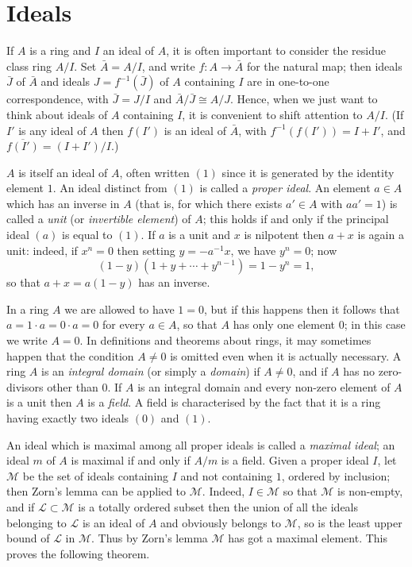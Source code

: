 \section{Ideals}\label{sec:1}

If $A$ is a ring and $I$ an ideal of $A$, it is often important to consider
the residue class ring $A/I$. Set $\bar{A} = A/I$, and write $f\colon A \to \bar{A}$ for the
natural map; then ideals $\bar{J}$ of $\bar{A}$ and ideals $J = f^{-1}(\bar{J})$ of $A$ containing $I$ are
in one-to-one correspondence, with $\bar{J} = J/I$ and $\bar{A}/\bar{J} \cong A/J$. Hence, when
we just want to think about ideals of $A$ containing $I$, it is convenient to
shift attention to $A/I$. (If $I'$ is any ideal of $A$ then $f(I')$ is an ideal of $\bar{A}$,
with $f^{-1}(f(I')) = I + I'$, and $\overline{f(I')} = (I + I')/I$.)

$A$ is itself an ideal of $A$, often written $(1)$ since it is generated by the
identity element $1$. An ideal distinct from $(1)$ is called a \emph{proper ideal}.
An element $a \in A$ which has an inverse in $A$ (that is, for which there exists
$a' \in A$ with $aa' = 1$) is called a \emph{unit} (or \emph{invertible element}) of $A$; this holds
if and only if the principal ideal $(a)$ is equal to $(1)$. If $a$ is a unit and $x$ is
nilpotent then $a + x$ is again a unit: indeed, if $x^n = 0$ then setting $y = -a^{-1}x$,
we have $y^n = 0$; now
\[
  (1 - y)(1 + y + \cdots + y^{n-1}) = 1 - y^n = 1,
\]
so that $a + x = a(1 - y)$ has an inverse.

In a ring $A$ we are allowed to have $1 = 0$, but if this happens then it
follows that $a = 1 \cdot a = 0 \cdot a = 0$ for every $a \in A$, so that $A$ has only one
element $0$; in this case we write $A = 0$. In definitions and theorems about
rings, it may sometimes happen that the condition $A \neq 0$ is omitted even
when it is actually necessary. A ring $A$ is an \emph{integral domain} (or simply a
\emph{domain}) if $A \neq 0$, and if $A$ has no zero-divisors other than $0$. If $A$ is an
integral domain and every non-zero element of $A$ is a unit then $A$ is a
\emph{field}. A field is characterised by the fact that it is a ring having exactly
two ideals $(0)$ and $(1)$.

An ideal which is maximal among all proper ideals is called a \emph{maximal ideal};
an ideal $m$ of $A$ is maximal if and only if $A/m$ is a field. Given a
proper ideal $I$, let $\mathcal{M}$ be the set of ideals containing $I$ and not containing
$1$, ordered by inclusion; then Zorn's lemma can be applied to $\mathcal{M}$. Indeed,
$I \in \mathcal{M}$ so that $\mathcal{M}$ is non-empty, and if $\mathcal{L} \subset \mathcal{M}$ is a totally ordered subset
then the union of all the ideals belonging to $\mathcal{L}$ is an ideal of $A$ and obviously
belongs to $\mathcal{M}$, so is the least upper bound of $\mathcal{L}$ in $\mathcal{M}$. Thus by Zorn's
lemma $\mathcal{M}$ has got a maximal element. This proves the following theorem.

